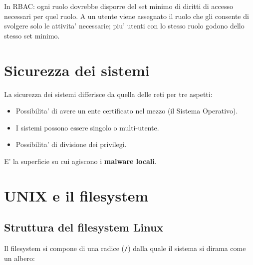 In RBAC: ogni ruolo dovrebbe disporre del set minimo di diritti di accesso necessari per quel ruolo. A un utente viene assegnato il ruolo che gli consente di svolgere solo le attivita' necessarie; piu' utenti con lo stesso ruolo godono dello stesso set minimo.

\section{Sicurezza dei sistemi}
La sicurezza dei sistemi differisce da quella delle reti per tre aspetti:
\begin{itemize}
  \item Possibilita' di avere un ente certificato nel mezzo (il Sistema Operativo).
  \item I sistemi possono essere singolo o multi-utente.
  \item Possibilita' di divisione dei privilegi.
\end{itemize}
E' la superficie su cui agiscono i \textbf{malware locali}.


\section{UNIX e il filesystem}

\subsection{Struttura del filesystem Linux}
Il filesystem si compone di una radice (\texttt{/}) dalla quale il sistema si dirama come un albero:

